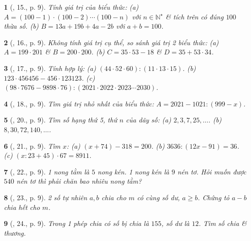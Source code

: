 \documentclass{article}
\newtheorem{baitoan}{}
\begin{document}
\begin{baitoan}[\cite{Tuyen_Toan_6}, 15., p. 9]
	Tính giá trị của biểu thức: (a) $A = (100 - 1)\cdot(100 - 2)\cdots(100 - n)$ với $n\in\mathbb{N}^\star$ \& tích trên có đúng $100$ thừa số. (b) $B = 13a + 19b + 4a - 2b$ với $a + b = 100$.
\end{baitoan}

\begin{baitoan}[\cite{Tuyen_Toan_6}, 16., p. 9]
	Không tính giá trị cụ thể, so sánh giá trị 2 biểu thức: (a) $A = 199\cdot201$ \& $B = 200\cdot200$. (b) $C = 35\cdot53 - 18$ \& $D = 35 + 53\cdot34$.
\end{baitoan}

\begin{baitoan}[\cite{Tuyen_Toan_6}, 17., p. 9]
	Tính hợp lý: (a) $(44\cdot52\cdot60):(11\cdot13\cdot15)$. (b) $123\cdot456456 - 456\cdot123123$. (c) $(98\cdot7676 - 9898\cdot76):(2021\cdot2022\cdot2023\cdots2030)$.
\end{baitoan}

\begin{baitoan}[\cite{Tuyen_Toan_6}, 18., p. 9]
	Tìm giá trị nhỏ nhất của biểu thức: $A = 2021 - 1021:(999 - x)$.
\end{baitoan}

\begin{baitoan}[\cite{Tuyen_Toan_6}, 20., p. 9]
	Tìm số hạng thứ 5, thứ $n$ của dãy số: (a) $2,3,7,25,\ldots$. (b) $8,30,72,140,\ldots$.
\end{baitoan}

\begin{baitoan}[\cite{Tuyen_Toan_6}, 21., p. 9]
	Tìm $x$: (a) $(x + 74) - 318 = 200$. (b) $3636:(12x - 91) = 36$. (c) $(x:23 + 45)\cdot67 = 8911$.
\end{baitoan}

\begin{baitoan}[\cite{Tuyen_Toan_6}, 22., p. 9]
	1 nong tằm là $5$ nong kén. 1 nong kén là $9$ nén tơ. Hỏi muốn được $540$ nén tơ thì phải chăn bao nhiêu nong tằm?
\end{baitoan}

\begin{baitoan}[\cite{Tuyen_Toan_6}, 23., p. 9]
	2 số tự nhiên $a,b$ chia cho $m$ có cùng số dư, $a\ge b$. Chứng tỏ $a - b$ chia hết cho $m$.
\end{baitoan}

\begin{baitoan}[\cite{Tuyen_Toan_6}, 24., p. 9]
	Trong 1 phép chia có số bị chia là $155$, số dư là $12$. Tìm số chia \& thương.
\end{baitoan}
\end{document}
